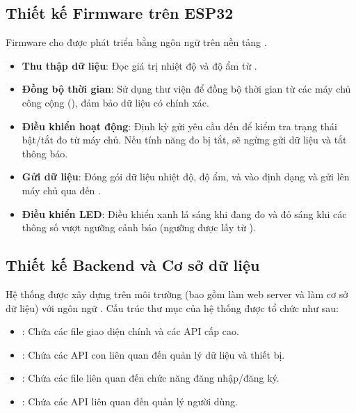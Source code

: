 \subsection{Thiết kế Firmware trên ESP32}
Firmware cho  được phát triển bằng ngôn ngữ  trên nền tảng .
\begin{itemize}
	\item \textbf{Thu thập dữ liệu}: Đọc giá trị nhiệt độ và độ ẩm từ .
	\item \textbf{Đồng bộ thời gian}: Sử dụng thư viện  để đồng bộ thời gian từ các máy chủ  công cộng (), đảm bảo dữ liệu có  chính xác.
	\item \textbf{Điều khiển hoạt động}: Định kỳ gửi yêu cầu  đến   để kiểm tra trạng thái bật/tắt đo từ máy chủ. Nếu tính năng đo bị tắt,  sẽ ngừng gửi dữ liệu và tắt  thông báo.
	\item \textbf{Gửi dữ liệu}: Đóng gói dữ liệu nhiệt độ, độ ẩm,  và  vào định dạng  và gửi lên máy chủ qua  đến .
	\item \textbf{Điều khiển LED}: Điều khiển  xanh lá sáng khi đang đo và  đỏ sáng khi các thông số vượt ngưỡng cảnh báo (ngưỡng được lấy từ ).
\end{itemize}

\subsection{Thiết kế Backend và Cơ sở dữ liệu}
Hệ thống  được xây dựng trên môi trường  (bao gồm  làm web server và  làm cơ sở dữ liệu) với ngôn ngữ . Cấu trúc thư mục của hệ thống  được tổ chức như sau:

\begin{itemize}
	\item {}: Chứa các file giao diện chính và các API cấp cao.
	\item {}: Chứa các API con liên quan đến quản lý dữ liệu và thiết bị.
	\item {}: Chứa các file liên quan đến chức năng đăng nhập/đăng ký.
	\item {}: Chứa các API liên quan đến quản lý người dùng.
\end{itemize}

